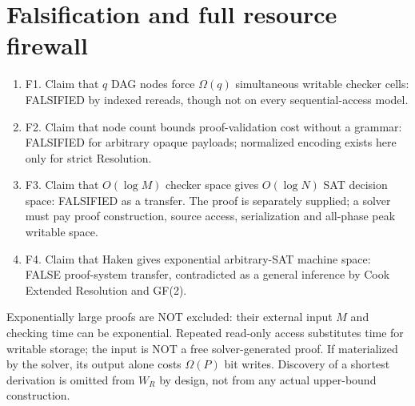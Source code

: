 \documentclass[11pt]{article}
\begin{document}
\section*{Falsification and full resource firewall}
\begin{enumerate}
\item[] F1. Claim that $q$ DAG nodes force $\Omega(q)$ simultaneous writable checker cells: FALSIFIED by indexed rereads, though not on every sequential-access model.
\item[] F2. Claim that node count bounds proof-validation cost without a grammar: FALSIFIED for arbitrary opaque payloads; normalized encoding exists here only for strict Resolution.
\item[] F3. Claim that $O(\log M)$ checker space gives $O(\log N)$ SAT decision space: FALSIFIED as a transfer. The proof is separately supplied; a solver must pay proof construction, source access, serialization and all-phase peak writable space.
\item[] F4. Claim that Haken gives exponential arbitrary-SAT machine space: FALSE proof-system transfer, contradicted as a general inference by Cook Extended Resolution and GF(2).
\end{enumerate}
Exponentially large proofs are NOT excluded: their external input $M$ and checking time can be exponential. Repeated read-only access substitutes time for writable storage; the input is NOT a free solver-generated proof. If materialized by the solver, its output alone costs $\Omega(P)$ bit writes. Discovery of a shortest derivation is omitted from $W_R$ by design, not from any actual upper-bound construction.
\end{document}
